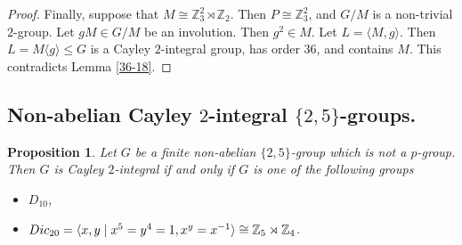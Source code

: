 \documentclass{amsart}
\newtheorem{pro}[thm]{Proposition}
\def \leq {\leqslant}
\begin{document}
\begin{proof}
	Finally, suppose that $M \cong \mathbb{Z}_3^2 \rtimes \mathbb{Z}_2$. Then $P \cong \mathbb{Z}_3^2$, and $G/M$ is a non-trivial $2$-group. Let $gM \in G/M$ be an involution. Then $g^2 \in M$. Let $L = \langle M, g \rangle$. Then $L = M \langle g \rangle \leq G$ is a Cayley $2$-integral group, has order $36$, and contains $M$. This contradicts Lemma \ref{36-18}.
\end{proof}

\subsection{Non-abelian Cayley $2$-integral $\{2,5\}$-groups.}
\begin{pro}\label{2,5}
	Let $G$ be a finite non-abelian $\{2,5\}$-group which is not a $p$-group. Then $G$ is Cayley $2$-integral if and only if $G$ is one of the following groups
	\begin{itemize}
		\item[(1)] $D_{10}$,
		\item[(2)] $Dic_{20}=\langle x,y\mid x^5=y^4=1, x^y=x^{-1}\rangle\cong\Bbb Z_5\rtimes\Bbb Z_4$.
	\end{itemize}
\end{pro}
\end{document}

